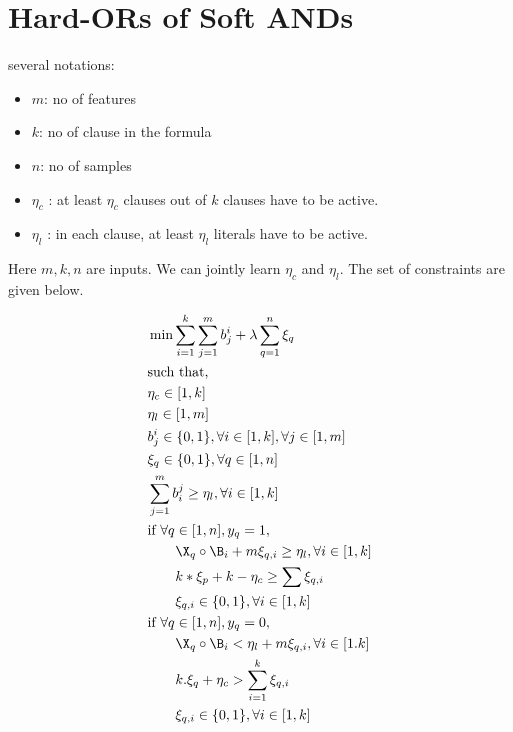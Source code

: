 
\section{Hard-ORs  of Soft ANDs }
several notations: 
\begin{itemize}
	\item $ m $: no of features
	\item $ k $: no of clause in the formula
	\item $ n $: no of samples 
	\item $ \eta_{c} $ : at least $ \eta_{c} $  clauses out of $ k $ clauses have to be active.
	\item $ \eta_{l} $ : in each clause, at least $ \eta_{l} $ literals have to be active.
	
\end{itemize}
Here $ m,k,n $ are inputs. 
We can jointly learn $ \eta_{c} $ and $ \eta_l $. The set of constraints are given below.

\begin{equation}
 	\label{eq:ilp}
 	\begin{split}
 	&\min \sum_{i=1}^k\sum_{j=1}^m b_j^i + \lambda \sum_{q=1}^n \xi_q \\
 	&\text{such that,}\\
 	& \eta_c \in [1,k]\\
 	& \eta_l \in [1,m] \\
 	&b_j^i \in \{0,1\},  \forall i \in [1,k], \forall j \in [1,m]\\
 	&\xi_q \in \{0,1\}, \forall q \in [1,n]\\
 	& \sum_{j=1}^m b_i^j \ge \eta_l, \forall i \in [1,k] \\ 
 	&\text{if } \forall q \in [1,n], y_q=1,\\
 	&\qquad \X_q\circ \B_i+ m\xi_{q,i} \ge \eta_{l},  \forall i \in [1,k]\\
 	& \qquad   k*\xi_p + k-\eta_c \ge \sum \xi_{q,i}\\
 	&\qquad \xi_{q,i} \in \{0,1\},  \forall i \in [1,k]\\
 	&\text{if } \forall q \in [1,n], y_q=0,\\
 	&\qquad \X_q\circ \B_i < \eta_{l} + m  \xi_{q,i},  \forall i\in [1.k]\\
 	&\qquad  k.\xi_q  + \eta_{c} > \sum_{i=1}^k\xi_{q,i}\\
 	&\qquad \xi_{q,i} \in \{0,1\},  \forall i \in [1,k]
 	\end{split}
\end{equation}